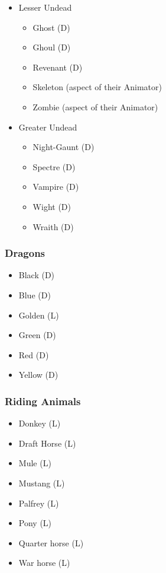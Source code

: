 \begin{multicols}{3}
\begin{itemize}
\item Lesser Undead
\begin{itemize}
\item Ghost (D)
\item Ghoul (D)
\item Revenant (D)
\item Skeleton (aspect of their Animator)
\item Zombie (aspect of their Animator)
\end{itemize}

\item Greater Undead
\begin{itemize}
\item Night-Gaunt (D)
\item Spectre (D)
\item Vampire (D)
\item Wight (D)
\item Wraith (D)
\end{itemize}
\end{itemize}

\subsubsection{Dragons}

\begin{itemize}
\item Black (D)
\item Blue (D)
\item Golden (L)
\item Green (D)
\item Red (D)
\item Yellow (D)
\end{itemize}

\subsubsection{Riding Animals}

\begin{itemize}
\item Donkey (L)
\item Draft Horse (L)
\item Mule (L)
\item Mustang (L)
\item Palfrey (L)
\item Pony (L)
\item Quarter horse (L)
\item War horse (L)
\end{itemize}

\end{multicols}
